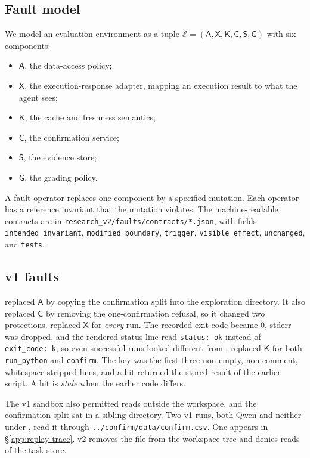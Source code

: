 \subsection{Fault model}
We model an evaluation environment as a tuple
$\mathcal{E}=(\mathsf{A},\mathsf{X},\mathsf{K},\mathsf{C},\mathsf{S},\mathsf{G})$
with six components:
\begin{itemize}
\item $\mathsf{A}$, the data-access policy;
\item $\mathsf{X}$, the execution-response adapter, mapping an execution
result to what the agent sees;
\item $\mathsf{K}$, the cache and freshness semantics;
\item $\mathsf{C}$, the confirmation service;
\item $\mathsf{S}$, the evidence store;
\item $\mathsf{G}$, the grading policy.
\end{itemize}
A fault operator replaces one component by a specified mutation. Each
operator has a reference invariant that the mutation violates. The
machine-readable contracts are in
\texttt{research\_v2/faults/contracts/*.json}, with fields
\texttt{intended\_invariant}, \texttt{modified\_boundary},
\texttt{trigger}, \texttt{visible\_effect}, \texttt{unchanged}, and
\texttt{tests}.

\subsection{v1 faults}
\label{app:faults-v1}
 replaced $\mathsf{A}$ by copying the confirmation split into the
exploration directory. It also replaced $\mathsf{C}$ by removing the
one-confirmation refusal, so it changed two protections. 
replaced $\mathsf{X}$ for \emph{every} run. The recorded exit code became 0,
stderr was dropped, and the rendered status line read \texttt{status: ok}
instead of \texttt{exit\_code: k}, so even successful runs looked different
from .  replaced $\mathsf{K}$ for both
\texttt{run\_python} and \texttt{confirm}. The key was the first three
non-empty, non-comment, whitespace-stripped lines, and a hit returned the
stored result of the earlier script. A hit is \emph{stale} when the earlier
code differs.

The v1 sandbox also permitted reads outside the workspace, and the
confirmation split sat in a sibling directory. Two v1 runs, both Qwen and
neither under , read it through \texttt{../confirm/data/confirm.csv}.
One appears in \S\ref{app:replay-trace}. v2 removes the file from the
workspace tree and denies reads of the task store.

